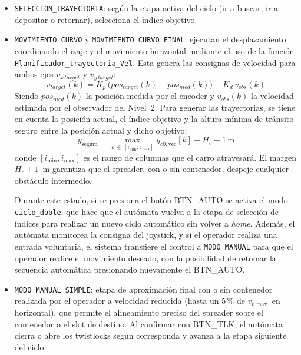 \begin{itemize}
\begin{itemize}
        \item \texttt{SELECCION\_TRAYECTORIA}: según la etapa activa del ciclo (ir a buscar, ir
        a depositar o retornar), selecciona el índice objetivo.
        
        \item \texttt{MOVIMIENTO\_CURVO} y \texttt{MOVIMIENTO\_CURVO\_FINAL}: ejecutan el
        desplazamiento coordinando el izaje y el movimiento horizontal mediante el uso de la función
        \texttt{Planificador\_trayectoria\_Vel}. Esta genera las consignas de velocidad para ambos ejes $v_{x\,target}$ y
        $v_{y\,target}$:
        \begin{equation}
            v_{target}(k) = K_{p} \, \bigl(pos_{target}(k) - pos_{med}(k)\bigr) - K_{d} \, v_{obs}(k)
            \label{eq:control_pd}
        \end{equation}
        Siendo $pos_{med}(k)$ la posición medida por el encoder y $v_{obs}(k)$ la velocidad
        estimada por el observador del Nivel~2. Para generar las trayectorias, se
        tiene en cuenta la posición actual, el índice objetivo y la altura mínima 
        de tránsito seguro entre la posición actual y dicho objetivo:
        \begin{equation}
            y_{\text{segura}} = \max_{k \,\in\, [i_{\min},\, i_{\max}]} y_{c0,\text{vec}}[k]
            + H_c + 1\,\text{m}
            \label{eq:altura_segura}
        \end{equation}
        donde $[i_{\min}, i_{\max}]$ es el rango de columnas que el carro atravesará. El margen
        $H_c + 1$~m garantiza que el spreader, con o sin contenedor, despeje cualquier
        obstáculo intermedio.
        
        Durante este estado, si se presiona el botón \textcolor{signalcolor}{BTN\_AUTO}
        se activa el modo \texttt{ciclo\_doble}, que hace que el autómata vuelva 
        a la etapa de selección de índices para realizar un nuevo ciclo automático sin volver
        a \textit{home}.
        Además, el autómata monitorea la consigna del joystick, y si el operador realiza una entrada
        voluntaria, el sistema transfiere el control a \texttt{MODO\_MANUAL} para
        que el operador realice el movimiento deseado, con la posibilidad de retomar la
        secuencia automática presionando nuevamente el \textcolor{signalcolor}{BTN\_AUTO}.
        
        \item \texttt{MODO\_MANUAL\_SIMPLE}: etapa de aproximación final con o sin contenedor
        realizada por el operador a velocidad reducida (hasta un 5\,\% de $v_{t\,\max}$ en
        horizontal), que permite el alineamiento preciso del spreader sobre el contenedor o
        el slot de destino. Al confirmar con \textcolor{signalcolor}{BTN\_TLK}, el autómata
        cierra o abre los twistlocks según corresponda y avanza a la etapa siguiente del ciclo.
    \end{itemize}


\end{itemize}
